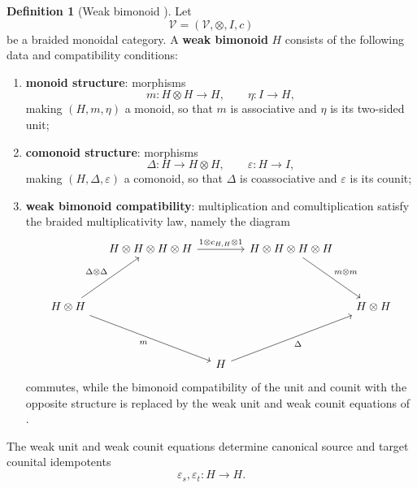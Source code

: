 \documentclass[oneside]{article}
\theoremstyle{plain}
\theoremstyle{definition}
\newtheorem{definition}[theorem]{Definition}
\theoremstyle{remark}
\begin{document}
\begin{definition}[Weak bimonoid {\cite[Def.~1.1]{PastroStreet2009}}]
\label{def:cgqg-background-weak-bimonoid}
    Let
    \[
        \mathcal V=(\mathcal V,\otimes,I,c)
    \]
    be a braided monoidal category. A \textbf{weak bimonoid} \(H\) consists of
    the following data and compatibility conditions:
    \begin{enumerate}
        \item \textbf{monoid structure}: morphisms
        \[
            m:H\otimes H\longrightarrow H,
            \qquad
            \eta:I\longrightarrow H,
        \]
        making \((H,m,\eta)\) a monoid, so that \(m\) is associative and \(\eta\) is its two-sided unit;

        \item \textbf{comonoid structure}: morphisms
        \[
            \Delta:H\longrightarrow H\otimes H,
            \qquad
            \varepsilon:H\longrightarrow I,
        \]
        making \((H,\Delta,\varepsilon)\) a comonoid, so that \(\Delta\) is coassociative and \(\varepsilon\) is its counit;

        \item \textbf{weak bimonoid compatibility}: multiplication and comultiplication satisfy the braided multiplicativity law, namely the diagram
        \begin{equation}
            \begin{tikzcd}[column sep=small, row sep=huge]
                & H\otimes H\otimes H\otimes H \ar[rr, "1\otimes c_{H,H}\otimes1"] & & H\otimes H\otimes H\otimes H \ar[dr, "m \otimes m"] & \\
                H\otimes H \ar[ur, "\Delta \otimes \Delta"] \ar[drr, swap, "m"] &&&& H\otimes H \\
                && H \ar[urr, swap, "\Delta"] &&
            \end{tikzcd}
            \label{eq:cgqg-background-weak-bimonoid-multiplicativity}
        \end{equation}
        commutes, while the bimonoid compatibility of the unit and counit with the opposite structure is replaced by the weak unit and weak counit equations of
        \cite[Def.~1.1]{PastroStreet2009}.
    \end{enumerate}
    The weak unit and weak counit equations determine canonical source and target counital idempotents
    \[
        \varepsilon_s,\varepsilon_t:H\longrightarrow H.
    \]
\end{definition}
\end{document}
